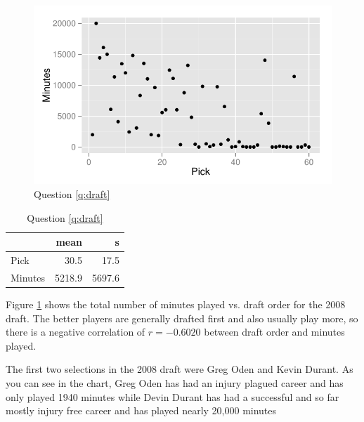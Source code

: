 \documentclass[letterpaper]{exam}
\begin{document}
\begin{questions}
          \begin{figure}[H]
            \centering
            \includegraphics[scale = 1]{figures/draft.pdf}
            \caption{Question \ref{q:draft}}
            \label{fig:draft}
          \end{figure}

          \begin{table}[H]
            \centering
            \begin{tabular}{lrr}
              \toprule
                       & mean   & s \\
              \midrule
              Pick     & 30.5   & 17.5 \\
              Minutes  & 5218.9 & 5697.6 \\
              \bottomrule
            \end{tabular}
            \caption{Question \ref{q:draft}}
          \end{table}

          Figure \ref{fig:draft} shows the total number of minutes played vs.  draft
          order for the 2008 draft.  The better players are generally drafted first
          and also usually play more, so there is a negative correlation of 
          $r = -0.6020$ between draft order and minutes played.

          The first two selections in the 2008 draft were Greg Oden and Kevin Durant.
          As you can see in the chart, Greg Oden has had an injury plagued career and
          has only played 1940 minutes while Devin Durant has had a successful and so
          far mostly injury free career and has played nearly 20,000 minutes

\end{questions}
\end{document}
